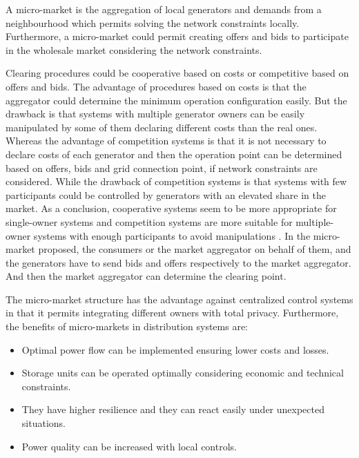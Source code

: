 \documentclass[a4paper,11pt,twoside,openright]{report}
\begin{document}
A micro-market is the aggregation of local generators and demands from a neighbourhood
which permits solving the network constraints locally.
Furthermore, a micro-market could permit creating offers and bids to participate in the wholesale market considering the network constraints.

Clearing procedures could be cooperative based on costs or competitive based on offers and bids. The advantage of procedures based on costs is that the aggregator could determine the minimum operation configuration easily. 
But the drawback is that systems with multiple generator owners can be easily manipulated by some of them declaring different costs than the real ones. 
Whereas the advantage of competition systems is that it is not necessary to declare costs of each generator and then the operation point can be determined based on offers, bids and grid connection point, if network constraints are considered. 
While the drawback of competition systems is that systems with few participants could be controlled by generators with an elevated share in the market.
As a conclusion, cooperative systems seem to be more appropriate for single-owner systems and competition systems are more suitable for multiple-owner systems with enough participants to avoid manipulations \cite{Microgrids_Nikos}. 
In the micro-market proposed, the consumers or the market aggregator on behalf of them, and the generators have to send bids and offers respectively to the market aggregator. And then the market aggregator can determine the clearing point. 

The micro-market structure has the advantage against centralized control systems in that it permits integrating different owners with total privacy. Furthermore, the benefits of micro-markets in distribution systems are:

\begin{itemize}
	\item Optimal power flow can be implemented ensuring lower costs and losses.
	\item Storage units can be operated optimally considering economic and technical constraints.
	\item They have higher resilience and they can react easily under unexpected situations.
	\item Power quality can be increased with local controls.
\end{itemize}
\end{document}
